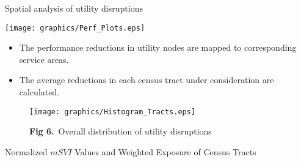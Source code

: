 \documentclass[ctrsize,landscape]{baposter}
\begin{document}
\begin{poster}
\begin{posterbox}[name=problems,column=2,row = 0, headerColorOne=white, headerborder = open]{}
\vspace*{-0.7cm}
    \begin{description}
        \item [Spatial analysis of utility disruptions]
    \end{description}\vspace*{-0.05cm}
    \begin{minipage}{0.45\textwidth}
    \captionsetup{justification=raggedright, singlelinecheck=false}
          \texttt{[image: graphics/Perf\_Plots.eps]}
          \label{fig:Spatial}
    \end{minipage} \hspace*{0.1cm}\hfill
    \begin{minipage}{0.53\textwidth}
    \begin{itemize}
    \item The performance reductions in utility nodes are mapped to corresponding service areas.
    \item The average reductions in each census tract under consideration are calculated.
    \end{itemize}\vspace*{-0.2cm}
    \begin{figure}[H]
          \hspace*{1cm}\texttt{[image: graphics/Histogram\_Tracts.eps]}
          \captionsetup{justification=raggedright, singlelinecheck=false}
          \caption*{\hspace*{1cm}\textcolor{utblack}{\scriptsize \textbf{Fig 6.}~Overall distribution of utility disruptions}}
          \label{fig:Histogram}
        \end{figure}
    \end{minipage}
    \vspace*{0.1cm}
    \begin{description}
        \item [Normalized $mSVI$ Values and Weighted Exposure  of Census Tracts]
    \end{description}\vspace*{-0.4cm}
    \begin{minipage}{0.45\textwidth}
        \vspace*{-1cm}\begin{itemize}

\end{itemize}
\end{minipage}
\end{posterbox}
\end{poster}
\end{document}
